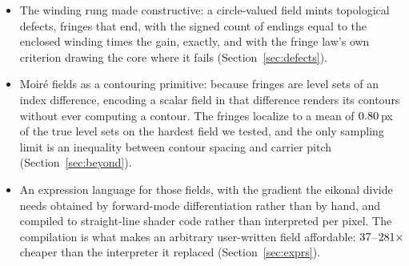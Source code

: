 \begin{itemize}
  \item The winding rung made constructive: a circle-valued field mints
  topological defects, fringes that end, with the signed count of endings
  equal to the enclosed winding times the gain, exactly, and with the fringe
  law's own criterion drawing the core where it fails
  (Section~\ref{sec:defects}).

  \item Moir\'e fields as a contouring primitive: because fringes are level sets
  of an index difference, encoding a scalar field in that difference renders its
  contours without ever computing a contour. The fringes localize to a mean of
  $0.80$\,px of the true level sets on the hardest field we tested,
  and the only sampling limit is an inequality between contour spacing and
  carrier pitch (Section~\ref{sec:beyond}).

  \item An expression language for those fields, with the gradient the eikonal
  divide needs obtained by forward-mode differentiation rather than by hand, and
  compiled to straight-line shader code rather than interpreted per pixel. The
  compilation is what makes an arbitrary user-written field affordable:
  $37$--$281\times$ cheaper than the interpreter it replaced
  (Section~\ref{sec:exprs}).
\end{itemize}
